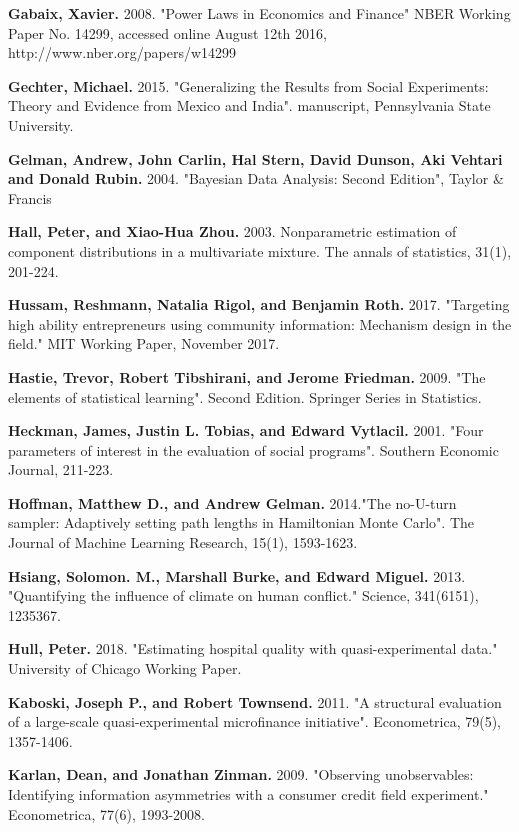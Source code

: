 \documentclass[AER]{AEA}
\begin{document}
\begin{thebibliography}{99}
 \textbf{ Gabaix, Xavier.} 2008. "Power Laws in Economics and Finance" NBER Working Paper No. 14299, accessed online August 12th 2016, http://www.nber.org/papers/w14299

 \textbf{ Gechter, Michael.} 2015. "Generalizing the Results from Social Experiments: Theory and Evidence from Mexico and India". manuscript, Pennsylvania State University.

 \textbf{ Gelman, Andrew, John Carlin, Hal Stern, David Dunson, Aki Vehtari and Donald Rubin.} 2004. "Bayesian Data Analysis: Second Edition", Taylor \& Francis

 \textbf{ Hall, Peter, and Xiao-Hua Zhou.} 2003. Nonparametric estimation of component distributions in a multivariate mixture. The annals of statistics, 31(1), 201-224.

 \textbf{ Hussam, Reshmann, Natalia Rigol, and Benjamin Roth.} 2017. "Targeting high ability entrepreneurs using community information: Mechanism design in the field." MIT Working Paper, November 2017.

 \textbf{ Hastie, Trevor, Robert Tibshirani, and Jerome Friedman.} 2009. "The elements of statistical learning". Second Edition. Springer Series in Statistics.

 \textbf{ Heckman, James, Justin L. Tobias, and Edward Vytlacil.} 2001. "Four parameters of interest in the evaluation of social programs". Southern Economic Journal, 211-223.

 \textbf{ Hoffman, Matthew D., and Andrew Gelman.} 2014."The no-U-turn sampler: Adaptively setting path lengths in Hamiltonian Monte Carlo". The Journal of Machine Learning Research, 15(1), 1593-1623.

 \textbf{ Hsiang, Solomon. M., Marshall Burke, and Edward Miguel.} 2013. "Quantifying the influence of climate on human conflict." Science, 341(6151), 1235367.

 \textbf{ Hull, Peter.} 2018. "Estimating hospital quality with quasi-experimental data." University of Chicago Working Paper.

 \textbf{ Kaboski, Joseph P., and Robert Townsend.} 2011. "A structural evaluation of a large-scale quasi-experimental microfinance initiative". Econometrica, 79(5), 1357-1406.

 \textbf{ Karlan, Dean, and Jonathan Zinman.} 2009. "Observing unobservables: Identifying information asymmetries with a consumer credit field experiment." Econometrica, 77(6), 1993-2008.


\end{thebibliography}
\end{document}

